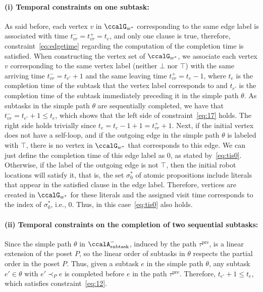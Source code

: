 \documentclass[Afour,sageh,times]{sagej}
\newcommand{\auto}[1]{\ccalA_{\textup{#1}}}
\begin{document}
{\paragraph{(i) Temporal constraints on one subtask:} As said before, each vertex $v$ in $\ccalG_{w^*}$ corresponding to the same edge label is associated with time $t_{vr}^- = t_{vr}^+ = t_e$, and only one clause is true, therefore, constraint~\eqref{eq:edgetime} regarding the computation of the completion time is satisfied. When constructing the vertex set of $\ccalG_{w^*}$, we associate each vertex $v$ corresponding to the same vertex label (neither $\bot$ nor $\top$) with the same arriving time $t_{vr}^- = t_{e'}+1$ and the same leaving time $t_{vr}^+ = t_{e}-1$, where $t_e$ is the completion time of the subtask that the vertex label corresponds to and $t_{e'}$ is the completion time of the subtask immediately preceding it in the simple path $\theta$. As subtasks in  the simple path $\theta$ are sequentially completed, we have that $t_{vr}^- = t_{e'}+1\leq t_e$, which shows that the left side of constraint~\eqref{eq:17} holds. The right side holds trivially since $t_e = t_e-1+1 = t_{vr}^+ +1$. Next, if the initial vertex does not have a self-loop, and if the outgoing edge in the simple path $\theta$ is labeled with $\top$, there is no vertex in $\ccalG_{w^*}$ that corresponds to this edge. We can just define the completion time of this edge label as 0, as stated by~\eqref{eq:tis0}. Otherwise, if the label of the outgoing edge is not $\top$, then the initial robot locations will satisfy it, that is, the set $\sigma^*_0$ of atomic propositions include literals that appear in the satisfied clause in the edge label.
Therefore, vertices are created in $\ccalG_{w^*}$ for these literals and the assigned visit time corresponds to the index of $\sigma_0^*$, i.e., 0. Thus, in this case~\eqref{eq:tis0} also holds.

\paragraph{(ii) Temporal constraints on the completion of two sequential subtasks:}
Since the simple path $\theta$ in $\auto{subtask}^-$, induced by the path $\tau^\text{pre}$, is a linear extension of the poset $P$, so the linear order of subtasks in $\theta$ respects the partial order in the poset $P$. Thus, given a subtask $e$ in the simple path $\theta$, any subtask $e'\in \theta$ with $e' \prec_P e$ is completed before $e$ in the path $\tau^\text{pre}$. Therefore, $t_{e'} +1 \leq t_e$, which satisfies constraint~\eqref{eq:12}.
}
\end{document}
